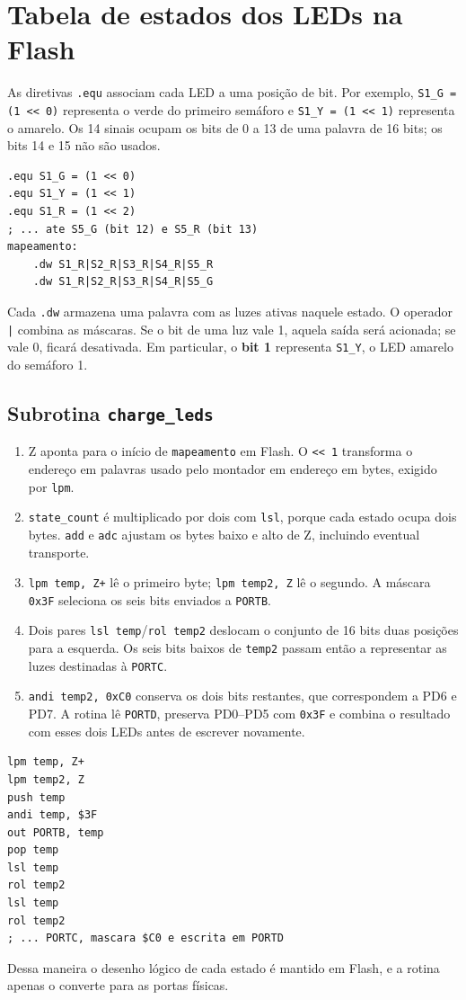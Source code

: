 \documentclass[12pt,a4paper]{article}
\newcommand{\reg}[1]{\texttt{#1}}
\begin{document}
\section{Tabela de estados dos LEDs na Flash}
As diretivas \reg{.equ} associam cada LED a uma posição de bit. Por exemplo, \reg{S1\_G = (1 << 0)} representa o verde do primeiro semáforo e \reg{S1\_Y = (1 << 1)} representa o amarelo. Os 14 sinais ocupam os bits de 0 a 13 de uma palavra de 16 bits; os bits 14 e 15 não são usados.
\begin{lstlisting}
.equ S1_G = (1 << 0)
.equ S1_Y = (1 << 1)
.equ S1_R = (1 << 2)
; ... ate S5_G (bit 12) e S5_R (bit 13)
mapeamento:
    .dw S1_R|S2_R|S3_R|S4_R|S5_R
    .dw S1_R|S2_R|S3_R|S4_R|S5_G
\end{lstlisting}
Cada \reg{.dw} armazena uma palavra com as luzes ativas naquele estado. O operador \reg{|} combina as máscaras. Se o bit de uma luz vale 1, aquela saída será acionada; se vale 0, ficará desativada. Em particular, o \textbf{bit 1} representa \reg{S1\_Y}, o LED amarelo do semáforo 1.

\subsection{Subrotina \texttt{charge\_leds}}
\begin{enumerate}
\item Z aponta para o início de \reg{mapeamento} em Flash. O \reg{<< 1} transforma o endereço em palavras usado pelo montador em endereço em bytes, exigido por \reg{lpm}.
\item \reg{state\_count} é multiplicado por dois com \reg{lsl}, porque cada estado ocupa dois bytes. \reg{add} e \reg{adc} ajustam os bytes baixo e alto de Z, incluindo eventual transporte.
\item \reg{lpm temp, Z+} lê o primeiro byte; \reg{lpm temp2, Z} lê o segundo. A máscara \reg{0x3F} seleciona os seis bits enviados a \reg{PORTB}.
\item Dois pares \reg{lsl temp}/\reg{rol temp2} deslocam o conjunto de 16 bits duas posições para a esquerda. Os seis bits baixos de \reg{temp2} passam então a representar as luzes destinadas à \reg{PORTC}.
\item \reg{andi temp2, 0xC0} conserva os dois bits restantes, que correspondem a PD6 e PD7. A rotina lê \reg{PORTD}, preserva PD0--PD5 com \reg{0x3F} e combina o resultado com esses dois LEDs antes de escrever novamente.
\end{enumerate}
\begin{lstlisting}
lpm temp, Z+
lpm temp2, Z
push temp
andi temp, $3F
out PORTB, temp
pop temp
lsl temp
rol temp2
lsl temp
rol temp2
; ... PORTC, mascara $C0 e escrita em PORTD
\end{lstlisting}
Dessa maneira o desenho lógico de cada estado é mantido em Flash, e a rotina apenas o converte para as portas físicas.
\end{document}
